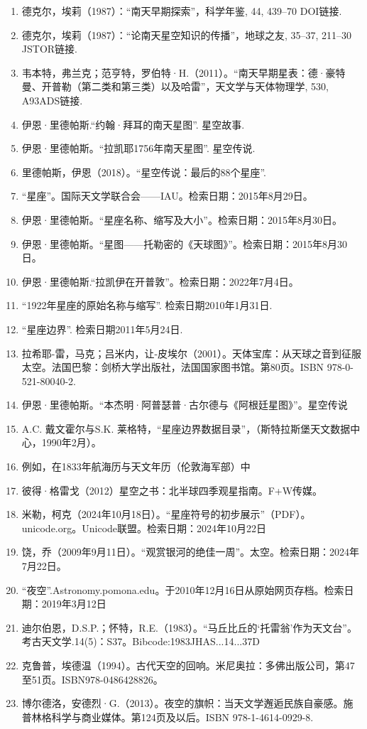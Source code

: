 \begin{enumerate}
\item 德克尔，埃莉（1987）：“南天早期探索”，科学年鉴, 44, 439–70 DOI链接.
\item 德克尔，埃莉（1987）：“论南天星空知识的传播”，地球之友, 35–37, 211–30 JSTOR链接.
\item 韦本特，弗兰克；范亨特，罗伯特·H.（2011）。“南天早期星表：德·豪特曼、开普勒（第二类和第三类）以及哈雷”，天文学与天体物理学, 530, A93ADS链接.
\item 伊恩·里德帕斯.“约翰·拜耳的南天星图”. 星空故事.
\item 伊恩·里德帕斯。“拉凯耶1756年南天星图”. 星空传说.
\item 里德帕斯，伊恩（2018）。“星空传说：最后的88个星座”.
\item “星座”。国际天文学联合会——IAU。检索日期：2015年8月29日。
\item 伊恩·里德帕斯。“星座名称、缩写及大小”。检索日期：2015年8月30日。
\item 伊恩·里德帕斯。“星图——托勒密的《天球图》”。检索日期：2015年8月30日。
\item 伊恩·里德帕斯.“拉凯伊在开普敦”。检索日期：2022年7月4日。
\item “1922年星座的原始名称与缩写”. 检索日期2010年1月31日.
\item “星座边界”. 检索日期2011年5月24日.
\item 拉希耶-雷，马克；吕米内，让-皮埃尔（2001）。天体宝库：从天球之音到征服太空。法国巴黎：剑桥大学出版社，法国国家图书馆。第80页。ISBN 978-0-521-80040-2.
\item 伊恩·里德帕斯。“本杰明·阿普瑟普·古尔德与《阿根廷星图》”。星空传说
\item A.C. 戴文霍尔与S.K. 莱格特，“星座边界数据目录”，（斯特拉斯堡天文数据中心，1990年2月）。
\item 例如，在1833年航海历与天文年历（伦敦海军部）中
\item 彼得·格雷戈（2012）星空之书：北半球四季观星指南。F+W传媒。
\item 米勒，柯克（2024年10月18日）。“星座符号的初步展示”（PDF）。unicode.org。Unicode联盟。检索日期：2024年10月22日
\item 饶，乔（2009年9月11日）。“观赏银河的绝佳一周”。太空。检索日期：2024年7月22日。
\item “夜空”.Astronomy.pomona.edu。于2010年12月16日从原始网页存档。检索日期：2019年3月12日
\item 迪尔伯恩，D.S.P.；怀特，R.E.（1983）。“马丘比丘的‘托雷翁’作为天文台”。考古天文学.14(5)：S37。Bibcode:1983JHAS...14...37D
\item 克鲁普，埃德温（1994）。古代天空的回响。米尼奥拉：多佛出版公司，第47至51页。ISBN978-0486428826。
\item 博尔德洛，安德烈·G.（2013）。夜空的旗帜：当天文学邂逅民族自豪感。施普林格科学与商业媒体。第124页及以后。ISBN 978-1-4614-0929-8.
\end{enumerate}
